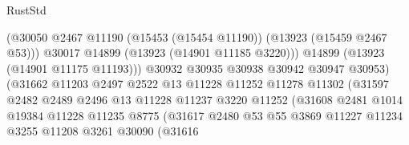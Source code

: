 \begin{lexlean}{RustStd}
\begin{coremodule}
                                          (@30050
                                            @2467
                                            @11190
                                            (@15453 (@15454 @11190))
                                            (@13923 (@15459 @2467 @53)))
                                          @30017
                                          @14899
                                          (@13923 (@14901 @11185 @3220)))
                                        @14899
                                        (@13923 (@14901 @11175 @11193)))
                                      @30932
                                      @30935
                                      @30938
                                      @30942
                                      @30947
                                      @30953)
                                    (@31662
                                      @11203
                                      @2497
                                      @2522
                                      @13
                                      @11228
                                      @11252
                                      @11278
                                      @11302
                                      (@31597
                                        @2482
                                        @2489
                                        @2496
                                        @13
                                        @11228
                                        @11237
                                        @3220
                                        @11252
                                        (@31608
                                          @2481
                                          @1014
                                          @19384
                                          @11228
                                          @11235
                                          @8775
                                          (@31617
                                            @2480
                                            @53
                                            @55
                                            @3869
                                            @11227
                                            @11234
                                            @3255
                                            @11208
                                            @3261
                                            @30090
                                            (@31616

\end{coremodule}
\end{lexlean}
